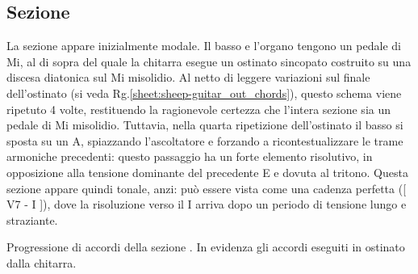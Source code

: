 \documentclass[class=book, crop=false, oneside, 12pt]{standalone}
\begin{document}
    \subsection{Sezione }
    La sezione  appare inizialmente modale. Il basso e l'organo tengono un pedale di Mi, al di sopra del quale la chitarra esegue un ostinato sincopato costruito su una discesa diatonica sul Mi misolidio. Al netto di leggere variazioni sul finale dell'ostinato (si veda Rg.\ref{sheet:sheep-guitar_out_chords}), questo schema viene ripetuto 4 volte, restituendo la ragionevole certezza che l'intera sezione sia un pedale di Mi misolidio. Tuttavia, nella quarta ripetizione dell'ostinato il basso si sposta su un A, spiazzando l'ascoltatore e forzando a ricontestualizzare le trame armoniche precedenti: questo passaggio ha un forte elemento risolutivo, in opposizione alla tensione dominante del precedente E e dovuta al tritono. Questa sezione appare quindi tonale, anzi: può essere vista come una cadenza perfetta ([ V7 - I ]), dove la risoluzione verso il I arriva dopo un periodo di tensione lungo e straziante.

    
    \begin{sheet}[htb]
        \centering
        \caption{Progressione di accordi della sezione . In evidenza gli accordi eseguiti in ostinato dalla chitarra.}
        \label{sheet:sheep-guitar_out_chords}
    \end{sheet}
    
\end{document}
